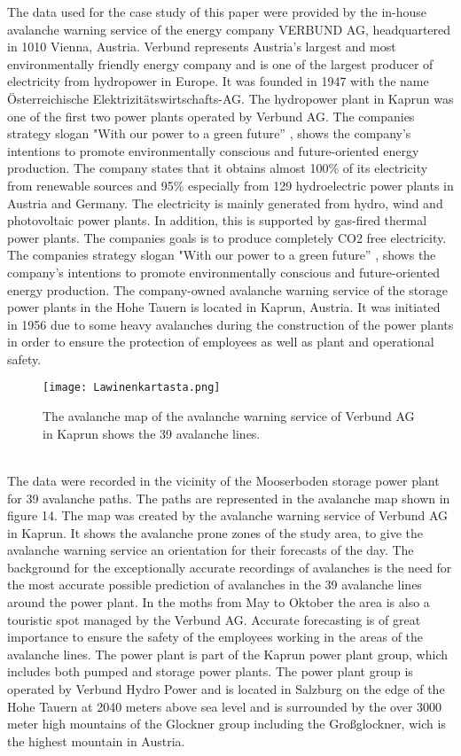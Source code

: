 \documentclass[../masterarbeit.tex]{subfiles}
\begin{document}
The data used for the case study of this paper were provided by the in-house avalanche warning service of the energy company VERBUND AG, headquartered in 1010 Vienna, Austria. Verbund represents Austria's largest and most environmentally friendly  energy company and is one of the largest producer of electricity from hydropower in Europe. It was founded in 1947 with the name Österreichische Elektrizitätswirtschafts-AG. The hydropower plant in Kaprun was one of the first two power plants operated by Verbund AG. \autocite[]{Verbund:2022} The companies strategy slogan "With our power to a green future” \autocite[]{Verbund:2022}, shows the company's intentions to promote environmentally conscious and future-oriented energy production. The company states that it obtains almost 100\% of its electricity from renewable sources and 95\% especially from 129 hydroelectric power plants in Austria and Germany. The electricity is mainly generated from hydro, wind and photovoltaic power plants. In addition, this is supported by gas-fired thermal power plants. The companies goals is to produce completely CO2 free electricity. \autocite[]{Verbund:2022} 
The companies strategy slogan "With our power to a green future” \autocite[]{Verbund:2022}, shows the company's intentions to promote environmentally conscious and future-oriented energy production. 
The company-owned avalanche warning service of the storage power plants in the Hohe Tauern is located in Kaprun, Austria. It was initiated in 1956 due to some heavy avalanches during the construction of the power plants in order to ensure the protection of employees as well as plant and operational safety.
\begin{figure}[h]
    \centering
    \texttt{[image: Lawinenkartasta.png]}
    \caption{The avalanche map of the avalanche warning service of Verbund AG in Kaprun shows the 39 avalanche lines.}
\end{figure} \\
The data were recorded in the vicinity of the Mooserboden storage power plant for 39 avalanche paths. The paths are represented in the avalanche map shown in figure 14. The map was created by the avalanche warning service of Verbund AG in Kaprun. It shows the avalanche prone zones of the study area, to give the avalanche warning service an orientation for their forecasts of the day. The background for the exceptionally accurate recordings of avalanches is the need for the most accurate possible prediction of avalanches in the 39 avalanche lines around the power plant. In the moths from May to Oktober the area is also a touristic spot managed by the Verbund AG\textcite[]{VerbundKaprun:2022}. Accurate forecasting is of great importance to ensure the safety of the employees working in the areas of the avalanche lines. The power plant is part of the Kaprun power plant group, which includes both pumped and storage power plants. The power plant group is operated by Verbund Hydro Power and is located in Salzburg on the edge of the Hohe Tauern at 2040 meters above sea level and is surrounded by the over 3000 meter high mountains of the Glockner group including the Großglockner, wich is the highest mountain in Austria. \autocite[]{VerbundKaprun:2022}
 
\end{document}
